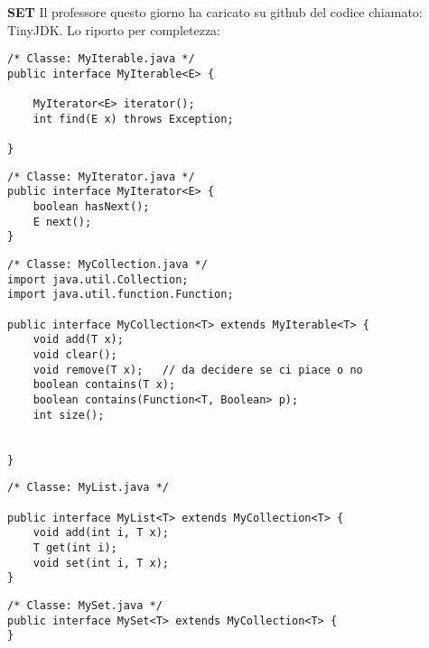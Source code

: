 \noindent \textbf{SET}\newline
Il professore questo giorno ha caricato su github del codice chiamato: TinyJDK. Lo riporto per completezza:
\begin{lstlisting}[basicstyle=\small,]
/* Classe: MyIterable.java */
public interface MyIterable<E> {

    MyIterator<E> iterator();
    int find(E x) throws Exception;

}
\end{lstlisting}

\begin{lstlisting}[basicstyle=\small,]
/* Classe: MyIterator.java */
public interface MyIterator<E> {
    boolean hasNext();
    E next();
}
\end{lstlisting}

\begin{lstlisting}[basicstyle=\small,]
/* Classe: MyCollection.java */
import java.util.Collection;
import java.util.function.Function;

public interface MyCollection<T> extends MyIterable<T> {
    void add(T x);
    void clear();
    void remove(T x);   // da decidere se ci piace o no
    boolean contains(T x);
    boolean contains(Function<T, Boolean> p);
    int size();


}
\end{lstlisting}

\begin{lstlisting}[basicstyle=\small,]
/* Classe: MyList.java */

public interface MyList<T> extends MyCollection<T> {
    void add(int i, T x);
    T get(int i);
    void set(int i, T x);
}
\end{lstlisting}

\begin{lstlisting}[basicstyle=\small,]
/* Classe: MySet.java */
public interface MySet<T> extends MyCollection<T> {
}
\end{lstlisting}


